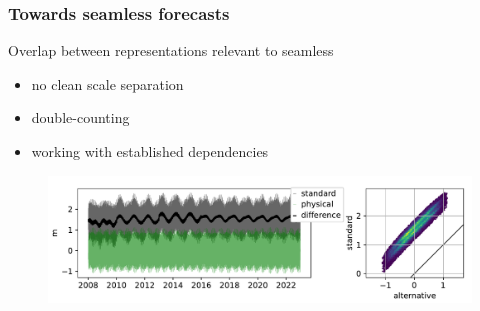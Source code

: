 \begin{frame}
\frametitle{Towards seamless forecasts}
Overlap between representations relevant to seamless
\begin{itemize}
    \item no clean scale separation
    \item double-counting
    \item working with established dependencies
\end{itemize}

    \begin{figure}      
    \includegraphics[height=\textheight]{figures/plots/piecewiseTide_62430.pdf}
    \end{figure}

\end{frame}